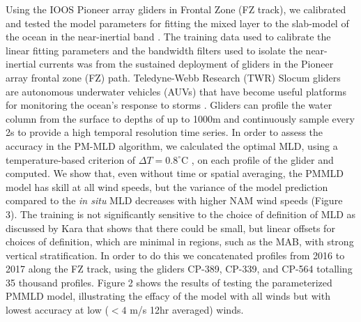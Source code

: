 \documentclass{article}
\begin{document}
Using the IOOS Pioneer array gliders in Frontal Zone (FZ track), we calibrated and tested the model parameters for fitting the mixed layer to the slab-model of the ocean in the near-inertial band \cite{gawarkiewicz2018changing}. 
The training data used to calibrate the linear fitting parameters and the bandwidth filters used to isolate the near-inertial currents was from the sustained deployment of gliders in the Pioneer array frontal zone (FZ) path.
Teledyne-Webb Research (TWR) Slocum gliders are autonomous underwater vehicles (AUVs) that have become useful platforms for monitoring the ocean’s response to storms \cite{Miles2013,Seroka2016}. 
Gliders can profile the water column from the surface to depths of up to 1000m and continuously sample every 2s to provide a high temporal resolution time series.
In order to assess the accuracy in the PM-MLD algorithm, we calculated the optimal MLD, using a temperature-based criterion of $\Delta T = 0.8^{\circ}$C \cite{Kara2000}, on each profile of the glider and computed. 
We show that, even without time or spatial averaging, the PMMLD model has skill at all wind speeds, but the variance of the model prediction compared to the \textit{in situ} MLD decreases with higher NAM wind speeds (Figure 3). 
The training is not significantly sensitive to the choice of definition of MLD as discussed by Kara \cite{Kara2000} that shows that there could be small, but linear offsets for choices of definition, which are minimal in regions, such as the MAB, with strong vertical stratification. 
In order to do this we concatenated profiles from 2016 to 2017 along the FZ track, using the gliders CP-389, CP-339, and CP-564 totalling 35 thousand profiles.
Figure 2 shows the results of testing the parameterized PMMLD model, illustrating the effacy of the model with all winds but with lowest accuracy at low ($<4$ m/s 12hr averaged) winds. 
\end{document}
